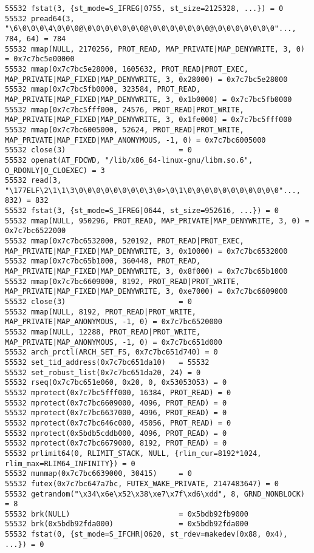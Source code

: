 \begin{verbatim}
55532 fstat(3, {st_mode=S_IFREG|0755, st_size=2125328, ...}) = 0
55532 pread64(3, "\6\0\0\0\4\0\0\0@\0\0\0\0\0\0\0@\0\0\0\0\0\0\0@\0\0\0\0\0\0\0"..., 784, 64) = 784
55532 mmap(NULL, 2170256, PROT_READ, MAP_PRIVATE|MAP_DENYWRITE, 3, 0) = 0x7c7bc5e00000
55532 mmap(0x7c7bc5e28000, 1605632, PROT_READ|PROT_EXEC, MAP_PRIVATE|MAP_FIXED|MAP_DENYWRITE, 3, 0x28000) = 0x7c7bc5e28000
55532 mmap(0x7c7bc5fb0000, 323584, PROT_READ, MAP_PRIVATE|MAP_FIXED|MAP_DENYWRITE, 3, 0x1b0000) = 0x7c7bc5fb0000
55532 mmap(0x7c7bc5fff000, 24576, PROT_READ|PROT_WRITE, MAP_PRIVATE|MAP_FIXED|MAP_DENYWRITE, 3, 0x1fe000) = 0x7c7bc5fff000
55532 mmap(0x7c7bc6005000, 52624, PROT_READ|PROT_WRITE, MAP_PRIVATE|MAP_FIXED|MAP_ANONYMOUS, -1, 0) = 0x7c7bc6005000
55532 close(3)                          = 0
55532 openat(AT_FDCWD, "/lib/x86_64-linux-gnu/libm.so.6", O_RDONLY|O_CLOEXEC) = 3
55532 read(3, "\177ELF\2\1\1\3\0\0\0\0\0\0\0\0\3\0>\0\1\0\0\0\0\0\0\0\0\0\0\0"..., 832) = 832
55532 fstat(3, {st_mode=S_IFREG|0644, st_size=952616, ...}) = 0
55532 mmap(NULL, 950296, PROT_READ, MAP_PRIVATE|MAP_DENYWRITE, 3, 0) = 0x7c7bc6522000
55532 mmap(0x7c7bc6532000, 520192, PROT_READ|PROT_EXEC, MAP_PRIVATE|MAP_FIXED|MAP_DENYWRITE, 3, 0x10000) = 0x7c7bc6532000
55532 mmap(0x7c7bc65b1000, 360448, PROT_READ, MAP_PRIVATE|MAP_FIXED|MAP_DENYWRITE, 3, 0x8f000) = 0x7c7bc65b1000
55532 mmap(0x7c7bc6609000, 8192, PROT_READ|PROT_WRITE, MAP_PRIVATE|MAP_FIXED|MAP_DENYWRITE, 3, 0xe7000) = 0x7c7bc6609000
55532 close(3)                          = 0
55532 mmap(NULL, 8192, PROT_READ|PROT_WRITE, MAP_PRIVATE|MAP_ANONYMOUS, -1, 0) = 0x7c7bc6520000
55532 mmap(NULL, 12288, PROT_READ|PROT_WRITE, MAP_PRIVATE|MAP_ANONYMOUS, -1, 0) = 0x7c7bc651d000
55532 arch_prctl(ARCH_SET_FS, 0x7c7bc651d740) = 0
55532 set_tid_address(0x7c7bc651da10)   = 55532
55532 set_robust_list(0x7c7bc651da20, 24) = 0
55532 rseq(0x7c7bc651e060, 0x20, 0, 0x53053053) = 0
55532 mprotect(0x7c7bc5fff000, 16384, PROT_READ) = 0
55532 mprotect(0x7c7bc6609000, 4096, PROT_READ) = 0
55532 mprotect(0x7c7bc6637000, 4096, PROT_READ) = 0
55532 mprotect(0x7c7bc646c000, 45056, PROT_READ) = 0
55532 mprotect(0x5bdb5cddb000, 4096, PROT_READ) = 0
55532 mprotect(0x7c7bc6679000, 8192, PROT_READ) = 0
55532 prlimit64(0, RLIMIT_STACK, NULL, {rlim_cur=8192*1024, rlim_max=RLIM64_INFINITY}) = 0
55532 munmap(0x7c7bc6639000, 30415)     = 0
55532 futex(0x7c7bc647a7bc, FUTEX_WAKE_PRIVATE, 2147483647) = 0
55532 getrandom("\x34\x6e\x52\x38\xe7\x7f\xd6\xdd", 8, GRND_NONBLOCK) = 8
55532 brk(NULL)                         = 0x5bdb92fb9000
55532 brk(0x5bdb92fda000)               = 0x5bdb92fda000
55532 fstat(0, {st_mode=S_IFCHR|0620, st_rdev=makedev(0x88, 0x4), ...}) = 0

\end{verbatim}
